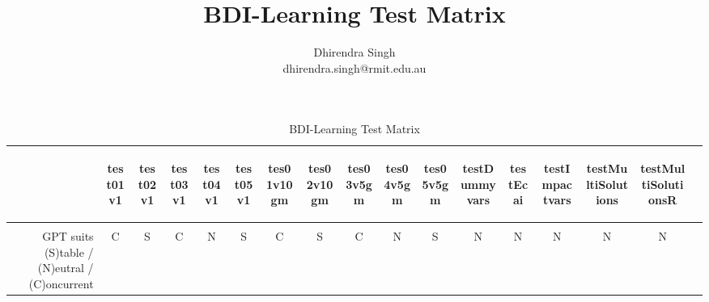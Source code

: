 \documentclass[landscape,a4paper,title page]{article}
\title{BDI-Learning Test Matrix}
\author{
Dhirendra Singh\\ 
dhirendra.singh@rmit.edu.au\\
}
\begin{document}
\maketitle

\begin{table}[!htb]
  \caption{BDI-Learning Test Matrix}
  \begin{tabular}{ r | c  c  c  c  c  c  c  c  c  c  c  c  c  c  c c }
  \begin{turn}{65}\end{turn} &
  \begin{turn}{65} test01v1 \end{turn} &
  \begin{turn}{65} test02v1 \end{turn} &
  \begin{turn}{65} test03v1 \end{turn} &
  \begin{turn}{65} test04v1 \end{turn} &
  \begin{turn}{65} test05v1 \end{turn} &
  \begin{turn}{65} tes01v10gm \end{turn} &
  \begin{turn}{65} tes02v10gm \end{turn} &
  \begin{turn}{65} tes03v5gm \end{turn} &
  \begin{turn}{65} tes04v5gm \end{turn} &
  \begin{turn}{65} tes05v5gm \end{turn} &
  \begin{turn}{65} testDummyvars \end{turn} &
  \begin{turn}{65} testEcai \end{turn} &
  \begin{turn}{65} testImpactvars \end{turn} &
  \begin{turn}{65} testMultiSolutions \end{turn} &
  \begin{turn}{65} testMultiSolutionsR \end{turn}
  \\ \hline \\
  GPT suits (S)table / (N)eutral / (C)oncurrent & C & S & C & N & S & C & S & C & N & S & N & N & N & N & N \\

\end{tabular}
\end{table}
\end{document}
